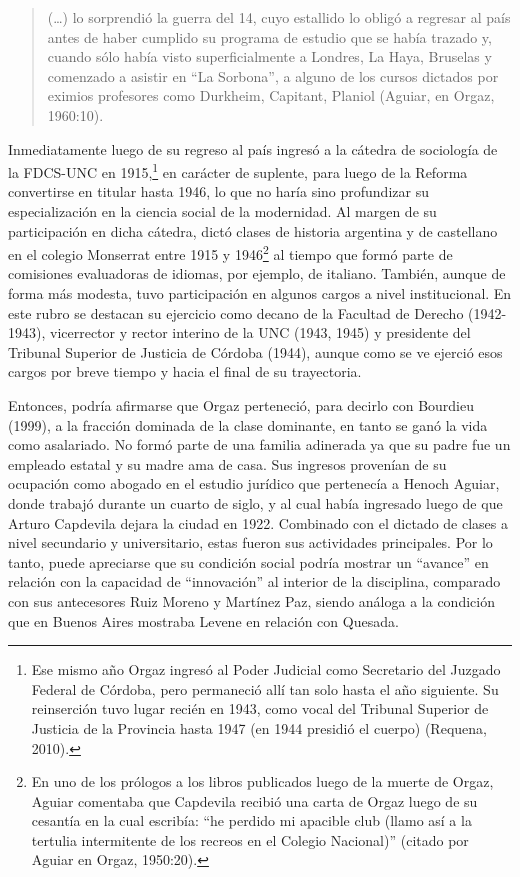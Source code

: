 \begin{quote}
(\ldots) lo sorprendió la guerra del 14, cuyo estallido lo obligó a regresar al país antes de haber cumplido su programa de estudio que se había trazado y, cuando sólo había visto superficialmente a Londres, La Haya, Bruselas y comenzado a asistir en ``La Sorbona'', a alguno de los cursos dictados por eximios profesores como Durkheim, Capitant, Planiol (Aguiar, en Orgaz, 1960:10).
\end{quote}

Inmediatamente luego de su regreso al país ingresó a la cátedra de sociología de la FDCS-UNC en 1915,\footnote{Ese mismo año Orgaz ingresó al Poder Judicial como Secretario del Juzgado Federal de Córdoba, pero permaneció allí tan solo hasta el año siguiente. Su reinserción tuvo lugar recién en 1943, como vocal del Tribunal Superior de Justicia de la Provincia hasta 1947 (en 1944 presidió el cuerpo) (Requena, 2010).} en carácter de suplente, para luego de la Reforma convertirse en titular hasta 1946, lo que no haría sino profundizar su especialización en la ciencia social de la modernidad. Al margen de su participación en dicha cátedra, dictó clases de historia argentina y de castellano en el colegio Monserrat entre 1915 y 1946\footnote{En uno de los prólogos a los libros publicados luego de la muerte de Orgaz, Aguiar comentaba que Capdevila recibió una carta de Orgaz luego de su cesantía en la cual escribía: ``he perdido mi apacible club (llamo así a la tertulia intermitente de los recreos en el Colegio Nacional)'' (citado por Aguiar en Orgaz, 1950:20).} al tiempo que formó parte de comisiones evaluadoras de idiomas, por ejemplo, de italiano. También, aunque de forma más modesta, tuvo participación en algunos cargos a nivel institucional. En este rubro se destacan su ejercicio como decano de la Facultad de Derecho (1942-1943), vicerrector y rector interino de la UNC (1943, 1945) y presidente del Tribunal Superior de Justicia de Córdoba (1944), aunque como se ve ejerció esos cargos por breve tiempo y hacia el final de su trayectoria.

Entonces, podría afirmarse que Orgaz perteneció, para decirlo con Bourdieu (1999), a la fracción dominada de la clase dominante, en tanto se ganó la vida como asalariado. No formó parte de una familia adinerada ya que su padre fue un empleado estatal y su madre ama de casa. Sus ingresos provenían de su ocupación como abogado en el estudio jurídico que pertenecía a Henoch Aguiar, donde trabajó durante un cuarto de siglo, y al cual había ingresado luego de que Arturo Capdevila dejara la ciudad en 1922. Combinado con el dictado de clases a nivel secundario y universitario, estas fueron sus actividades principales. Por lo tanto, puede apreciarse que su condición social podría mostrar un ``avance'' en relación con la capacidad de ``innovación'' al interior de la disciplina, comparado con sus antecesores Ruiz Moreno y Martínez Paz, siendo análoga a la condición que en Buenos Aires mostraba Levene en relación con Quesada.

